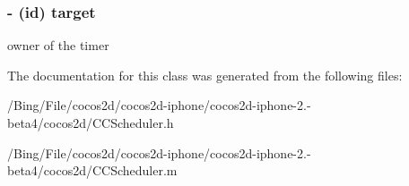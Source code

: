 \hypertarget{interface_c_c_timer_block_a818d961ff40f9f29415faa623b7242c5}{
\subsubsection[{target}]{\setlength{\rightskip}{0pt plus 5cm}-\/ (id) {\bf target}}}\label{interface_c_c_timer_block_a818d961ff40f9f29415faa623b7242c5}
owner of the timer 

The documentation for this class was generated from the following files\-:\begin{DoxyCompactItemize}
\item 
/\-Bing/\-File/cocos2d/cocos2d-\/iphone/cocos2d-\/iphone-\/2.-\/beta4/cocos2d/C\-C\-Scheduler.\-h\item 
/\-Bing/\-File/cocos2d/cocos2d-\/iphone/cocos2d-\/iphone-\/2.-\/beta4/cocos2d/C\-C\-Scheduler.\-m\end{DoxyCompactItemize}
